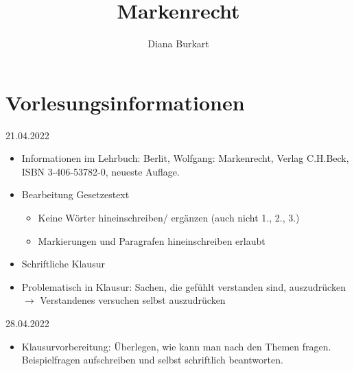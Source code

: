 \documentclass{report}
\title{Markenrecht}
\author{Diana Burkart}
\begin{document}
\maketitle
\newpage

\tableofcontents
\newpage

\chapter{Vorlesungsinformationen}
21.04.2022
\begin{itemize}
	\item Informationen im Lehrbuch: Berlit, Wolfgang: Markenrecht, Verlag C.H.Beck, ISBN 3-406-53782-0, neueste Auflage.
	\item Bearbeitung Gesetzestext
	\begin{itemize}
		\item Keine Wörter hineinschreiben/ ergänzen (auch nicht 1., 2., 3.)
		\item Markierungen und Paragrafen hineinschreiben erlaubt
	\end{itemize}
	\item Schriftliche Klausur
	\item Problematisch in Klausur:
	\newline Sachen, die gefühlt verstanden sind, auszudrücken $\rightarrow$ Verstandenes versuchen selbst auszudrücken
\end{itemize}
28.04.2022
\begin{itemize}
	\item Klausurvorbereitung: Überlegen, wie kann man nach den Themen fragen.
	\newline Beispielfragen aufschreiben und selbst schriftlich beantworten.
\end{itemize}
\end{document}
